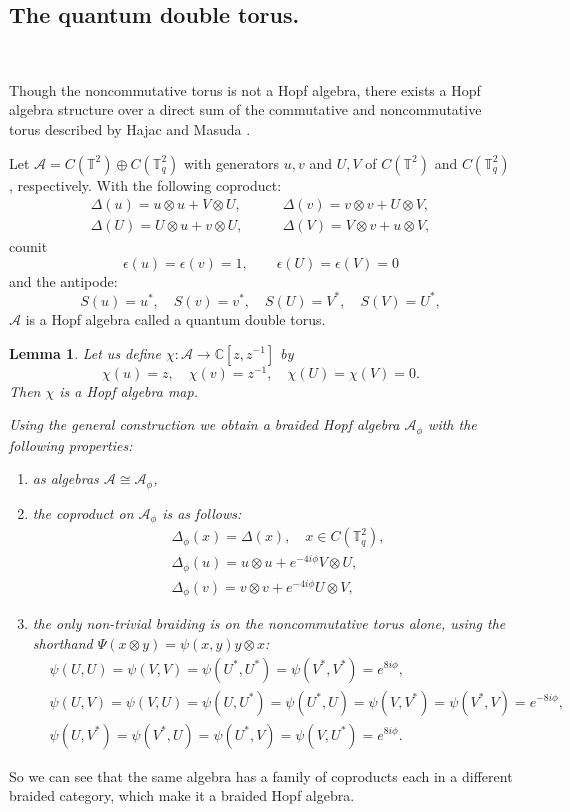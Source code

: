 \documentclass[12pt]{amsart}
\newtheorem{lem}[thm]{Lemma}
\theoremstyle{definition}
\numberwithin{equation}{section}
\renewcommand{\a}{\chi}             %
\newcommand{\ox}{\otimes}           %
\begin{document}
\subsection{The quantum double torus.}
\ \newline

Though the noncommutative torus is not a Hopf algebra, there exists a Hopf algebra structure over 
a direct sum of the commutative and noncommutative torus described by Hajac and Masuda 
\cite{HM98}.


Let $\mathcal{A}=C(\mathbb{T}^2)\oplus C(\mathbb{T}_q^2)$ with generators $u,v$ 
and $U,V$ of $C(\mathbb{T}^2)$ and $C(\mathbb{T}^2_q)$, respectively. 
With the following coproduct:
$$
\begin{aligned}
\Delta(u)=u\otimes u+V\otimes U, \qquad & 
\Delta(v)=v\otimes v+U\otimes V, \\
\Delta(U)=U\otimes u +v\otimes U, \qquad &
\Delta(V)=V\otimes v +u\otimes V,
\end{aligned}
$$
counit
$$
\epsilon(u)=\epsilon(v)=1, \qquad 
\epsilon(U)=\epsilon(V)=0
$$
and the antipode:
$$ 
S(u)=u^{\ast}, \quad S(v)=v^*,\quad S(U)=V^{\ast}, \quad S(V)=U^{\ast},
$$ 
$\mathcal{A}$ is a Hopf algebra called a quantum double torus.

\begin{lem}
Let us define $\a:\mathcal{A}\rightarrow \mathbb{C}[z,z^{-1}]$ by 
$$ \a(u)=z,\quad \a(v)=z^{-1}, \quad \a(U)=\a(V)=0.$$ 
Then $\a$ is a Hopf algebra map.

Using the general construction we obtain a braided Hopf algebra 
$\mathcal{A}_{\phi}$ with the following properties:
\begin{enumerate}
\item as algebras $\mathcal{A}\cong \mathcal{A}_\phi$,
\item the coproduct on $\mathcal{A}_\phi$ is as follows:
\begin{align}
&\Delta_\phi(x) = \Delta(x), \quad x \in C(\mathbb{T}_q^2), \\
&\Delta_\phi(u) = u\otimes u +e^{-4i\phi}V\otimes U, \\
&\Delta_{\phi}(v)=v\otimes v +e^{-4i\phi}U\otimes V, 
\end{align}
\item the only non-trivial braiding is on the noncommutative torus alone,
using the shorthand $\Psi(x \ox y) = \psi(x,y) y \ox x$:
\begin{align*}
& \psi(U,U)=\psi(V,V)=\psi(U^*,U^*)=\psi(V^*,V^*)=e^{8i\phi}, \\
& \psi(U,V)=\psi(V,U)=\psi(U,U^*)=\psi(U^*,U)=\psi(V,V^*)=\psi(V^*,V)= e^{-8i\phi}, \\
& \psi(U,V^*)=\psi(V^*,U)=\psi(U^*,V)=\psi(V,U^*)= e^{8i\phi}. 
\end{align*}
\end{enumerate}
\end{lem}
So we can see that the same algebra has a family of coproducts
each in a different braided category, which make it a braided Hopf algebra.
\end{document}
